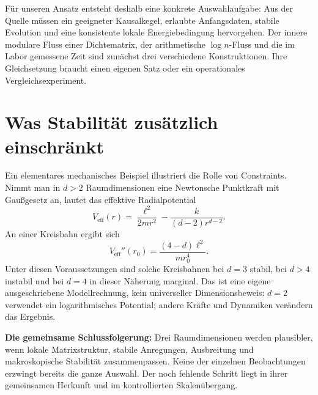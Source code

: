 Für unseren Ansatz entsteht deshalb eine konkrete Auswahlaufgabe: Aus der Quelle müssen ein geeigneter Kausalkegel, erlaubte Anfangsdaten, stabile Evolution und eine konsistente lokale Energiebedingung hervorgehen. Der innere modulare Fluss einer Dichtematrix, der arithmetische $\log n$-Fluss und die im Labor gemessene Zeit sind zunächst drei verschiedene Konstruktionen. Ihre Gleichsetzung braucht einen eigenen Satz oder ein operationales Vergleichsexperiment.

\section{Was Stabilität zusätzlich einschränkt}
Ein elementares mechanisches Beispiel illustriert die Rolle von Constraints. Nimmt man in $d>2$ Raumdimensionen eine Newtonsche Punktkraft mit Gaußgesetz an, lautet das effektive Radialpotential
\[
 V_{\mathrm{eff}}(r)=\frac{\ell^2}{2mr^2}-\frac{k}{(d-2)r^{d-2}}.
\]
An einer Kreisbahn ergibt sich
\[
 V_{\mathrm{eff}}''(r_0)=\frac{(4-d)\ell^2}{mr_0^4}.
\]
Unter diesen Voraussetzungen sind solche Kreisbahnen bei $d=3$ stabil, bei $d>4$ instabil und bei $d=4$ in dieser Näherung marginal. Das ist eine eigene ausgeschriebene Modellrechnung, kein universeller Dimensionsbeweis: $d=2$ verwendet ein logarithmisches Potential; andere Kräfte und Dynamiken verändern das Ergebnis.

\textbf{Die gemeinsame Schlussfolgerung:} Drei Raumdimensionen werden plausibler, wenn lokale Matrixstruktur, stabile Anregungen, Ausbreitung und makroskopische Stabilität zusammenpassen. Keine der einzelnen Beobachtungen erzwingt bereits die ganze Auswahl. Der noch fehlende Schritt liegt in ihrer gemeinsamen Herkunft und im kontrollierten Skalenübergang.
